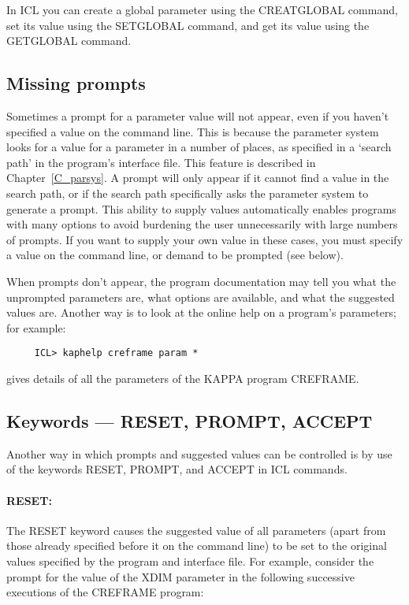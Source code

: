 In ICL you can create a global parameter using the CREATGLOBAL command, set its
value using the SETGLOBAL command, and get its value using the GETGLOBAL
command.

\subsection{Missing prompts}

Sometimes a prompt for a parameter value will not appear, even if you haven't
specified a value on the command line.
This is because the parameter system looks for a value for a parameter in a
number of places, as specified in a `search path' in the program's interface
file.
This feature is described in Chapter~\ref{C_parsys}.
A prompt will only appear if it cannot find a value in the search path, or if
the search path specifically asks the parameter system to generate a prompt.
This ability to supply values automatically enables programs with many options
to avoid burdening the user unnecessarily with large numbers of prompts.
If you want to supply your own value in these cases, you must specify a value
on the command line, or demand to be prompted (see below).

When prompts don't appear, the program documentation may tell you what the
unprompted parameters are, what options are available, and what the suggested
values are.
Another way is to look at the online help on a program's parameters; for
example:

\begin{small}
\begin{verbatim}
     ICL> kaphelp creframe param *
\end{verbatim}
\end{small}

gives details of all the parameters of the KAPPA program CREFRAME.

\subsection{Keywords --- RESET, PROMPT, ACCEPT}

Another way in which prompts and suggested values can be controlled is by use
of the keywords RESET, PROMPT, and ACCEPT in ICL commands.

\paragraph{RESET:}\hfill

The RESET keyword causes the suggested value of all parameters (apart from those
already specified before it on the command line) to be set to the original
values specified by the program and interface file.
For example, consider the prompt for the value of the XDIM parameter in the
following successive executions of the CREFRAME program:

